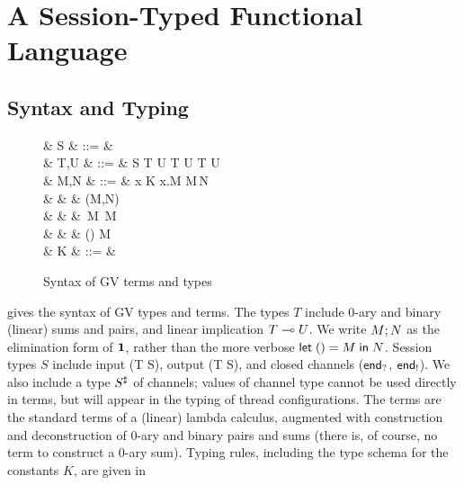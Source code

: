 \documentclass[oribibl,orivec,envcountsame]{llncs}
\begin{document}
\section{A Session-Typed Functional Language}\label{sec:gv}

\subsection{Syntax and Typing}\label{sec:gv-static}

\begin{figure}[t]
\begin{syntax}
   & S & ::= &  \mid {} \mid \interm \mid \outterm \mid {} \\
   & T,U & ::= & S \mid T \gvtimes U \mid \one \mid T \gvplus U \mid \zero \mid T \lto U \\ %
   & M,N & ::= & x \mid K \mid \lambda x.M \mid M\,N \\
  & & \mid & (M,N) \mid {} \\
  & & \mid & \,M \mid {}\,M \mid {} \\
  & & \mid & () \mid {} \mid {} \app M \\
   & K & ::= &  \mid {} \mid {} \mid {} \mid {}\\
\end{syntax}
\caption{Syntax of GV terms and types}\label{fig:gv-syntax}
\end{figure}

 gives the syntax of GV types and terms.  The types $T$ include 0-ary and binary
(linear) sums and pairs, and linear implication $T \multimap U$.  We write $M; N$ as the
elimination form of $\mathbf{1}$, rather than the more verbose $\mathsf{let}\;() = M\;\mathsf{in}\;N$.  Session types $S$
include input (\gvin T S), output (\gvout T S), and closed channels ($\mathsf{end}_?$, $\mathsf{end}_!$).  We
also include a type $S^\sharp$ of channels; values of channel type cannot be used directly in
terms, but will appear in the typing of thread configurations.  The terms are the standard terms of
a (linear) lambda calculus, augmented with construction and deconstruction of 0-ary and binary pairs
and sums (there is, of course, no term to construct a 0-ary sum).  Typing rules, including the type schema for the constants $K$, are given in
\end{document}
